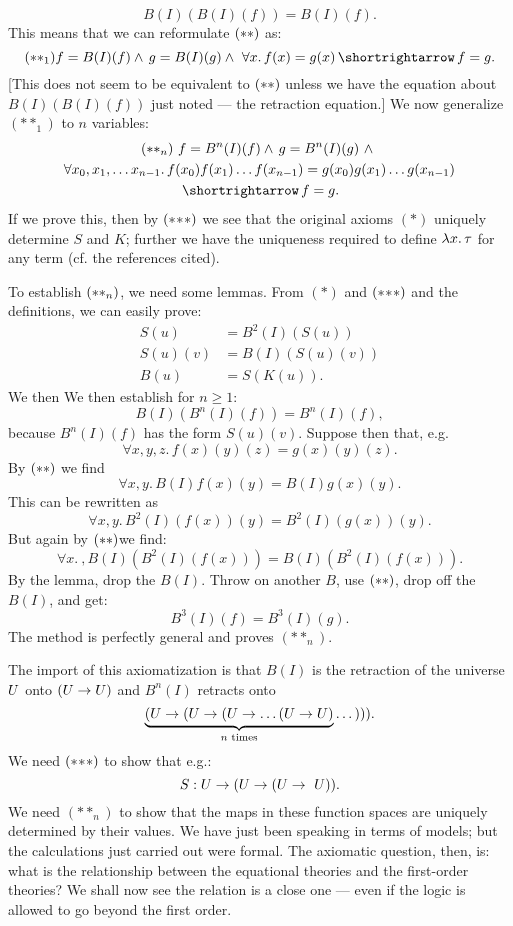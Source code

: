 $$
B(I)(B(I)(f)) = B(I)(f).
$$
This means that we can reformulate $\ss$ as:
$$
(**_1) f = B(I)(f) \land\, g = B(I)(g) \land\,\, \forall x.\,f(x) = g(x) \, \imp\, f = g.
$$
[This does not seem to be equivalent to $\ss$ unless we have the
equation about $B(I)(B(I)(f))$ just noted --- the retraction equation.] We now generalize $(**_1)$ to $n$ variables:
\begin{multline*}
\ssn \,\,
f = B^n(I)(f) \land\, g = B^n(I)(g) \,\,\land\,\, \\
\forall x_0, x_1, \dots x_{n-1}.\,f(x_0)f(x_1)\dots f(x_{n-1}) = g(x_0)g(x_1)\dots g(x_{n-1})\\
 \, \imp\, f = g.
\end{multline*}
If we prove this, then by $\sss$ we see that the original axioms $(*)$ uniquely determine $S$ and $K$; further we have the uniqueness required to define $\lm{x}.\tau$ for any term (cf. the references cited).

To establish $\ssn$, we need some lemmas.  From $(*)$ and $\sss$ and the definitions, we can easily prove:
\begin{align*}
S(u) &= B^2(I)(S(u))\\
S(u)(v) &= B(I)(S(u)(v))\\
B(u) &= S(K(u)).
\end{align*}
%
We then We then establish for $n\geq 1$:
$$
B(I)(B^n(I)(f)) = B^n(I)(f),
$$
because $B^n(I)(f)$ has the form $S(u)(v)$. Suppose then that, e.g.
$$
\forall x, y, z .\, f(x)(y)(z) = g(x)(y)(z).
$$
By $\ss$ we find
$$
\forall x, y. \, B(I)f(x)(y) = B(I)g(x)(y).
$$
This can be rewritten as
$$
\forall x,y. \, B^2(I)(f(x))(y) = B^2(I)(g(x))(y).
$$
But again by $\ss$we find:
$$
\forall x.\ , B(I)(B^2(I)(f(x)))=B(I)(B^2(I)(f(x))).
$$
By the lemma, drop the $B(I)$. Throw on another $B$, use $\ss$, drop off the $B(I)$, and get:
$$
B^3(I)(f) = B^3(I)(g).
$$
The method is perfectly general and proves $(**_n)$.

The import of this axiomatization is that $B(I)$ is the retraction of the universe $\U$ onto $(\U \to \U)$ and $B^n (I)$ retracts onto
$$
\underbrace{(\U \to (\U \to (\U \to \dots (\U \to \U)}_{n {\textrm{ times}}} \dots ))).
$$
We need $\sss$ to show that e.g.:
$$
S: \U \to (\U \to (\U \to\ U)).
$$
We need $(**_n)$ to show that the maps in these function spaces are uniquely determined by their values.
We have just been speaking in terms of models; but the calculations just carried out were formal. The axiomatic question, then, is: what is the relationship between the equational theories and the first-order theories? We shall now see the relation is a close one --- even if the logic is allowed to go beyond the first order.


